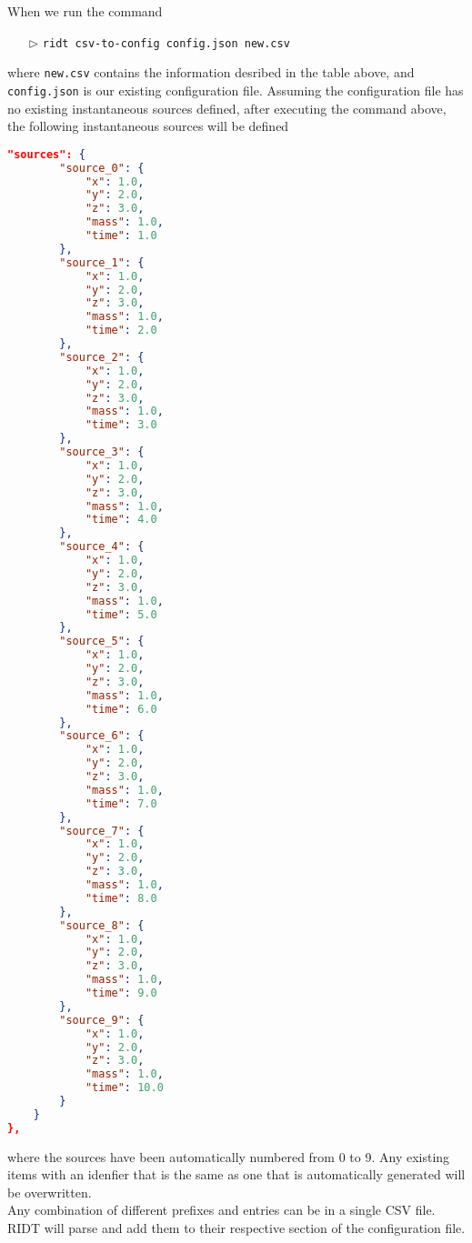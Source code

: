 \documentclass[]{article}
\def\code#1{\texttt{#1}}
\begin{document}
\noindent When we run the command
\begin{itemize}
    \item[$\triangleright$] \code{ridt csv-to-config config.json new.csv}
\end{itemize}

\noindent where \code{new.csv} contains the information desribed in the table above, and
\code{config.json} is our existing configuration file. Assuming the
configuration file has no existing instantaneous sources defined, after
executing the command above, the following instantaneous sources will be defined

\begin{lstlisting}[language=json,firstnumber=1]
"sources": {
        "source_0": {
            "x": 1.0,
            "y": 2.0,
            "z": 3.0,
            "mass": 1.0,
            "time": 1.0
        },
        "source_1": {
            "x": 1.0,
            "y": 2.0,
            "z": 3.0,
            "mass": 1.0,
            "time": 2.0
        },
        "source_2": {
            "x": 1.0,
            "y": 2.0,
            "z": 3.0,
            "mass": 1.0,
            "time": 3.0
        },
        "source_3": {
            "x": 1.0,
            "y": 2.0,
            "z": 3.0,
            "mass": 1.0,
            "time": 4.0
        },
        "source_4": {
            "x": 1.0,
            "y": 2.0,
            "z": 3.0,
            "mass": 1.0,
            "time": 5.0
        },
        "source_5": {
            "x": 1.0,
            "y": 2.0,
            "z": 3.0,
            "mass": 1.0,
            "time": 6.0
        },
        "source_6": {
            "x": 1.0,
            "y": 2.0,
            "z": 3.0,
            "mass": 1.0,
            "time": 7.0
        },
        "source_7": {
            "x": 1.0,
            "y": 2.0,
            "z": 3.0,
            "mass": 1.0,
            "time": 8.0
        },
        "source_8": {
            "x": 1.0,
            "y": 2.0,
            "z": 3.0,
            "mass": 1.0,
            "time": 9.0
        },
        "source_9": {
            "x": 1.0,
            "y": 2.0,
            "z": 3.0,
            "mass": 1.0,
            "time": 10.0
        }
    }
},
\end{lstlisting}
where the sources have been automatically numbered from 0 to 9. Any existing
items with an idenfier that is the same as one that is automatically generated
will be overwritten. \\

\noindent Any combination of different prefixes and entries can be in a single
CSV file. RIDT will parse and add them to their respective section of the
configuration file.
\end{document}
